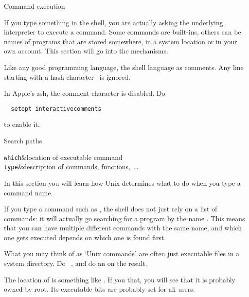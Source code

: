  {Command execution}

If you type something in the shell,
you are actually asking the underlying interpreter to execute a command.
Some commands are built-ins, others can be names of programs that
are stored somewhere, in a system location or in your own account.
This section will go into the mechanisms.

\begin{remark}
  Like any good programming language, the shell language as comments.
  Any line starting with a hash character~\n{#} is ignored.
\end{remark}
\begin{zshnote}
  In Apple's zsh, the comment character is disabled. Do
\begin{lstlisting}
  setopt interactivecomments
\end{lstlisting}
to enable it.
\end{zshnote}

 {Search paths}
\label{sec:PATH}

\begin{stufflearned}
  \lstinline+which+&location of executable command\\
  \lstinline+type+&description of commands, functions,~\ldots\\
\end{stufflearned}

\begin{purpose}
  In this section you will learn how Unix determines what to do when
  you type a command name.
\end{purpose}

If you type a command such as , the shell does not just rely on
a list of commands: it will actually go searching for a program by the
name . This means that you can have multiple different commands
with the same name, and which one gets executed depends on which one
is found first.

\begin{exercise}
  What you may think of as `Unix commands' are often just executable
  files in a system directory. Do ~, and do
  an  on the result.
\end{exercise}
\begin{outcome}
  The location of  is something like . If you
     that, you will see that it is probably owned by root. Its
    executable bits are probably set for all users.
\end{outcome}

